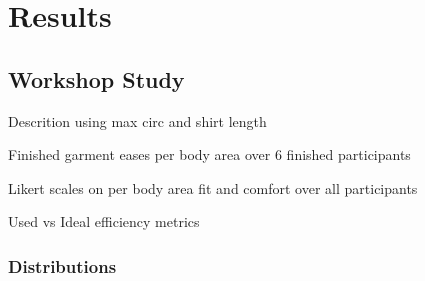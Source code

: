 \chapter{Results}

\section{Workshop Study}
Descrition using max circ and shirt length

Finished garment eases per body area over 6 finished participants

Likert scales on per body area fit and comfort over all participants

Used vs Ideal efficiency metrics

\subsection{Distributions}
